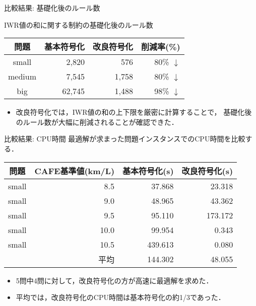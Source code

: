 \documentclass[dvipdfmx, 11pt,]{beamer}
\begin{document}
\begin{frame}{比較結果: 基礎化後のルール数} 
 \begin{exampleblock}{IWR値の和に関する制約の基礎化後のルール数} \centering 
  \begin{tabular}{c|r|r|r}
   問題 	& 基本符号化 	& 改良符号化 & 削減率(\%)	\\\hline
   small 	& 2,820		& \alert{576} & 80\% $\downarrow$ \\
   medium 	& 7,545		& \alert{1,758} & 80\% $\downarrow$ \\
   big 		& 62,745	& \alert{1,488} & 98\% $\downarrow$ \\
  \end{tabular}
 \end{exampleblock}
 \begin{itemize}
  \item 改良符号化では，IWR値の和の上下限を厳密に計算することで，
	基礎化後のルール数が大幅に削減されることが確認できた．
 \end{itemize}
\end{frame}
\begin{frame}{比較結果: CPU時間}
 最適解が求まった問題インスタンスでのCPU時間を比較する．
 \begin{exampleblock}{} \centering 
  \begin{tabular}{crrr}
   問題		& CAFE基準値(km/L)	 & 基本符号化(s)  & 改良符号化(s)   \\\hline
   small 	& 8.5  & 37.868          	& \alert{23.318}          \\
   small	& 9.0  & 48.965          & \alert{43.362}          \\
   small	& 9.5  & \alert{95.110}          & 173.172         \\
   small	& 10.0 & 99.954          & \alert{0.343}           \\
   small	& 10.5 & 439.613         & \alert{0.080}           \\\hline
   \multicolumn{2}{r}{平均}		 & 144.302			& \alert{48.055}
  \end{tabular}
 \end{exampleblock}
 \begin{itemize}
  \item 5問中4問に対して，改良符号化の方が高速に最適解を求めた．
  \item 平均では，改良符号化のCPU時間は基本符号化の約1/3であった．
 \end{itemize}
\end{frame}
\end{document}
